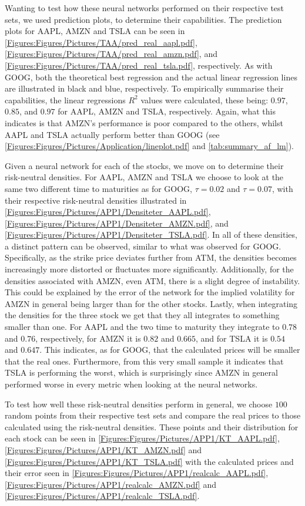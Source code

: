 Wanting to test how these neural networks performed on their respective test sets, we used prediction plots, to determine their capabilities. The prediction plots for AAPL, AMZN and TSLA can be seen in \autoref{Figures:Figures/Pictures/TAA/pred_real_aapl.pdf}, \autoref{Figures:Figures/Pictures/TAA/pred_real_amzn.pdf}, and \autoref{Figures:Figures/Pictures/TAA/pred_real_tsla.pdf}, respectively. As with GOOG, both the theoretical best regression and the actual linear regression lines are illustrated in black and blue, respectively. To empirically summarise their capabilities, the linear regressions $R^2$ values were calculated, these being: $0.97$, $0.85$, and $0.97$ for AAPL, AMZN and TSLA, respectively. Again, what this indicates is that AMZN's performance is poor compared to the others, whilst AAPL and TSLA actually perform better than GOOG (see \autoref{Figures:Figures/Pictures/Application/lineplot.pdf} and \autoref{tab:summary_af_lm}).

Given a neural network for each of the stocks, we move on to determine their risk-neutral densities. For AAPL, AMZN and TSLA we choose to look at the same two different time to maturities as for GOOG, $\tau=0.02$ and $\tau = 0.07$, with their respective risk-neutral densities illustrated in \autoref{Figures:Figures/Pictures/APP1/Densiteter_AAPL.pdf}, \autoref{Figures:Figures/Pictures/APP1/Densiteter_AMZN.pdf}, and \autoref{Figures:Figures/Pictures/APP1/Densiteter_TSLA.pdf}. In all of these densities, a distinct pattern can be observed, similar to what was observed for GOOG. Specifically, as the strike price deviates further from ATM, the densities becomes increasingly more distorted or fluctuates more significantly. Additionally, for the densities associated with AMZN, even ATM, there is a slight degree of instability. This could be explained by the error of the network for the implied volatility for AMZN in general being larger than for the other stocks. Lastly, when integrating the densities for the three stock we get that they all integrates to something smaller than one. For AAPL and the two time to maturity they integrate to $0.78$ and $0.76$, respectively, for AMZN it is $0.82$ and $0.665$, and for TSLA it is $0.54$ and $0.647$. This indicates, as for GOOG, that the calculated prices will be smaller that the real ones. Furthermore, from this very small sample it indicates that TSLA is performing the worst, which is surprisingly since AMZN in general performed worse in every metric when looking at the neural networks.

To test how well these risk-neutral densities perform in general, we choose $100$ random points from their respective test sets and compare the real prices to those calculated using the risk-neutral densities. These points and their distribution for each stock can be seen in \autoref{Figures:Figures/Pictures/APP1/KT_AAPL.pdf}, \autoref{Figures:Figures/Pictures/APP1/KT_AMZN.pdf} and \autoref{Figures:Figures/Pictures/APP1/KT_TSLA.pdf} with the calculated prices and their error seen in \autoref{Figures:Figures/Pictures/APP1/realcalc_AAPL.pdf}, \autoref{Figures:Figures/Pictures/APP1/realcalc_AMZN.pdf} and \autoref{Figures:Figures/Pictures/APP1/realcalc_TSLA.pdf}. 

